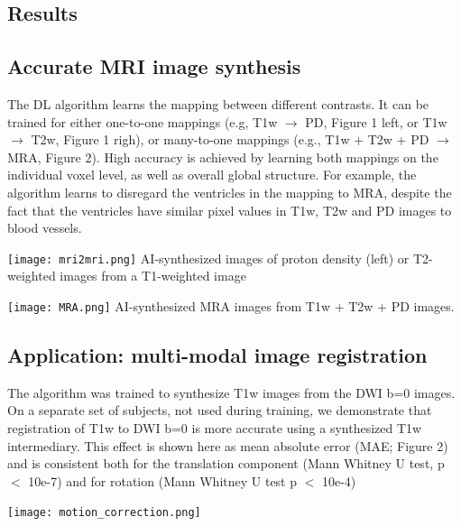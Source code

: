 \documentclass[a0, portrait]{a0poster}
\begin{document}
\begin{multicols}{2}
\color{Navy}
\section*{Results}
\subsection*{Accurate MRI image synthesis}
The DL algorithm learns the mapping between different contrasts. It can be trained for either one-to-one mappings (e.g, T1w $\rightarrow$ PD, Figure 1 left, or T1w $\rightarrow$ T2w, Figure 1 righ), or many-to-one mappings (e.g., T1w + T2w + PD $\rightarrow$ MRA, Figure 2). High accuracy is achieved by learning both mappings on the individual voxel level, as well as overall global structure. For example, the algorithm learns to disregard the ventricles in the mapping to MRA, despite the fact that the ventricles have similar pixel values in T1w, T2w and PD images to blood vessels.

\begin{minipage}[b]{1.0\linewidth}
  \texttt{[image: mri2mri.png]}
  \center AI-synthesized images of proton density (left) or T2-weighted images from a T1-weighted image
\end{minipage}

\begin{minipage}[t]{0.8\linewidth}
    \texttt{[image: MRA.png]}
    \center AI-synthesized MRA images from T1w + T2w + PD images.
\end{minipage}

\subsection*{Application: multi-modal image registration}

The algorithm was trained to synthesize T1w images from the DWI b=0 images. On a separate set of subjects, not used during training, we demonstrate that registration of T1w to DWI b=0 is more accurate using a synthesized T1w intermediary. This effect is shown here as mean absolute error (MAE; Figure 2) and is consistent both for the translation component (Mann Whitney U test, p $<$ 10e-7) and for rotation (Mann Whitney U test p $<$ 10e-4)

\begin{minipage}[t]{1.0\linewidth}
    \texttt{[image: motion\_correction.png]}
\end{minipage}


\end{multicols}
\end{document}
